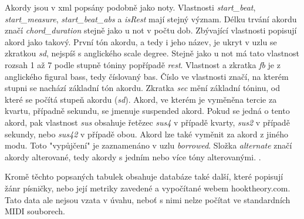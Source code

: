 Akordy jsou v xml popsány podobně jako noty.
Vlastnosti \emph{start\_beat}, \emph{start\_measure}, \emph{start\_beat\_abs}
a \emph{isRest} mají stejný význam.
Délku trvání akordu značí \emph{chord\_duration} stejně jako u not v počtu dob.
Zbývající vlastnosti popisují akord jako takový.
První tón akordu, a tedy i jeho název, 
je ukryt v uzlu se zkratkou \emph{sd},
nejspíš s anglického scale degree.
Stejně jako u not má tato vlastnost rozsah 1 až 7 podle stupně tóniny 
popřípadě \emph{rest}.
Vlastnost a zkratka \emph{fb} je z anglického figural bass, 
tedy číslovaný bas. 
Číslo ve vlastnosti značí, 
na kterém stupni se nachází základní tón akordu\cite{kofron}.
Zkratka \emph{sec} mění základní tóninu,
od které se počítá stupeň akordu (\emph{sd}).
Akord, ve kterém je vyměněna tercie za kvartu, případně sekundu,
se jmenuje suspended akord.
Pokud se jedná o tento akord, 
pak vlastnost \emph{sus} obsahuje řetězec \emph{sus4} v případě kvarty,
\emph{sus2} v případě sekundy, nebo \emph{sus42} v případě obou\cite{SimplifyingSuspended}.
Akord lze také vyměnit za akord z jiného modu.
Toto "vypůjčení" je zaznamenáno v uzlu \emph{borrowed}.
Složka \emph{alternate} značí akordy alterované, 
tedy akordy s jedním nebo více tóny alterovanými.
\cite{SzkanderaAlterovane}.
\par
Kromě těchto popsaných tabulek obsahuje databáze také další,
které popisují žánr písničky, 
nebo její metriky zavedené a vypočítané webem hooktheory.com.
Tato data ale nejsou vzata v úvahu, 
neboť s nimi nelze počítat ve standardních MIDI souborech.

